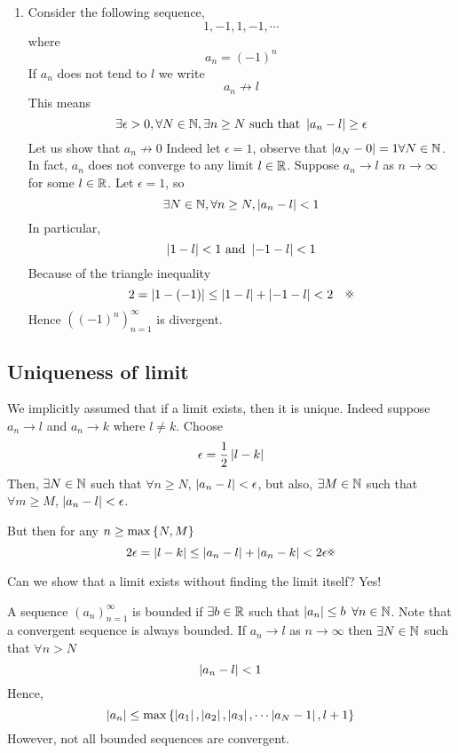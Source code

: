 \documentclass{article}
\begin{document}
\begin{eg}
\begin{enumerate}[label=(\roman*)]
        \item Consider the following sequence,
        \[
            1, -1, 1, -1, \cdots
        \]
        where
        \[
            a_n = (-1)^n  
        \]
        If $a_n$ does not tend to $l$ we write 
        \[
            a_n \not \rightarrow l  
        \]
        This means 
        \[
            \exists \epsilon > 0, \forall N \in \mathbb{N}, \exists n \geq N \text{ such that } \left\lvert a_n - l\right\rvert \geq \epsilon 
        \]
        Let us show that $a_n \not \rightarrow 0$
        Indeed let $\epsilon = 1$, observe that $\left\lvert a_N - 0\right\rvert = 1 \forall N \in \mathbb{N}$.
        In fact, $a_n$ does not converge to any limit $l \in \mathbb{R}$.
        Suppose $a_n \rightarrow l$ as $n \rightarrow \infty$ for some $l \in \mathbb{R}$.
        Let $\epsilon = 1$, so 
        \[
            \exists N \in \mathbb{N}, \forall n \geq N, \left\lvert a_n - l\right\rvert < 1  
        \]
        In particular,
        \[
            \left\lvert 1 - l\right\rvert < 1 \text{ and } \left\lvert -1 -l\right\rvert < 1  
        \]
        Because of the triangle inequality
        \[
            2 = \abs{1 - (-1)} \leq \abs{1 - l} + \abs{-1 - l} < 2 \quad \contradiction
        \]
        Hence $((-1)^n)_{n=1}^\infty$ is divergent.
    \end{enumerate}
\end{eg}

\subsection*{Uniqueness of limit}
We implicitly assumed that if a limit exists, then it is unique.
Indeed suppose $a_n \rightarrow l$ and $a_n \rightarrow k$ where $l \neq k$.
Choose
\[
    \epsilon = \frac{1}{2} \left\lvert l - k\right\rvert
\]
Then, $\exists N \in \mathbb{N}$ such that $\forall n \geq N$, $\left\lvert a_n - l\right\rvert < \epsilon$,
but also, $\exists M \in \mathbb{N}$ such that $\forall m \geq M$, $\left\lvert a_n - l\right\rvert < \epsilon$.

But then for any $n \geq \max \left\{ N, M \right\}$
\[
    2 \epsilon = \abs{l - k} \leq \abs{a_n - l} + \abs{a_n - k} < 2\epsilon \contradiction
\]

\begin{question}
    Can we show that a limit exists without finding the limit itself? Yes!
\end{question}
A sequence $(a_n)_{n=1}^\infty$ is bounded if $\exists b \in \mathbb{R}$ such that $\left\lvert a_n\right\rvert \leq b$ $\forall n \in \mathbb{N}$.
Note that a convergent sequence is always bounded.
If $a_n \rightarrow l$ as $n \rightarrow \infty$ then $\exists N \in \mathbb{N}$ such that $\forall n > N$
\[
    \left\lvert a_n - l\right\rvert < 1
\]
Hence,
\[
    \left\lvert a_n\right\rvert \leq \max \left\{ \left\lvert a_1\right\rvert, \left\lvert a_2\right\rvert, \left\lvert a_3\right\rvert, \cdots \left\lvert a_N-1\right\rvert, l + 1  \right\}
\]
However, not all bounded sequences are convergent.
\end{document}
